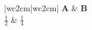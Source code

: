 \documentclass{article}
\begin{document}
\begin{longtable}{|w{c}{2cm}|w{c}{2cm}|}
\hline
\textbf{A} & \textbf{B} \\
\hline
\endhead
\endfoot
$\frac12$ & $\frac14$ \\
\hline
\end{longtable}
\end{document}
